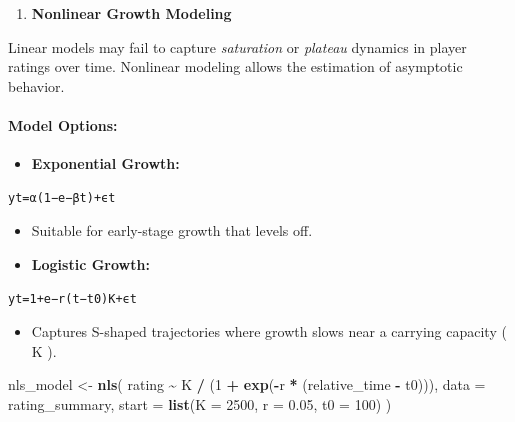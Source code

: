 \documentclass[
]{article}
\newenvironment{Shaded}{\begin{snugshade}}{\end{snugshade}}
\newcommand{\AttributeTok}[1]{\textcolor[rgb]{0.13,0.29,0.53}{#1}}
\newcommand{\DecValTok}[1]{\textcolor[rgb]{0.00,0.00,0.81}{#1}}
\newcommand{\FloatTok}[1]{\textcolor[rgb]{0.00,0.00,0.81}{#1}}
\newcommand{\FunctionTok}[1]{\textcolor[rgb]{0.13,0.29,0.53}{\textbf{#1}}}
\newcommand{\NormalTok}[1]{#1}
\newcommand{\OtherTok}[1]{\textcolor[rgb]{0.56,0.35,0.01}{#1}}
\newcommand{\SpecialCharTok}[1]{\textcolor[rgb]{0.81,0.36,0.00}{\textbf{#1}}}
\providecommand{\tightlist}{%
  \setlength{\itemsep}{0pt}\setlength{\parskip}{0pt}}
\begin{document}
\begin{enumerate}
\def\labelenumi{\arabic{enumi}.}
\setcounter{enumi}{1}
\tightlist
\item
  \textbf{Nonlinear Growth Modeling}
\end{enumerate}

Linear models may fail to capture \emph{saturation} or \emph{plateau}
dynamics in player ratings over time. Nonlinear modeling allows the
estimation of asymptotic behavior.

\paragraph{Model Options:}\label{model-options}

\begin{itemize}
\tightlist
\item
  \textbf{Exponential Growth:}
\end{itemize}

\begin{verbatim}
yt​=α(1−e−βt)+ϵt
\end{verbatim}

\begin{itemize}
\item
  Suitable for early-stage growth that levels off.
\item
  \textbf{Logistic Growth:}
\end{itemize}

\begin{verbatim}
yt​=1+e−r(t−t0​)K​+ϵt​
\end{verbatim}

\begin{itemize}
\tightlist
\item
  Captures S-shaped trajectories where growth slows near a carrying
  capacity ( K ).
\end{itemize}

\begin{Shaded}
\begin{Highlighting}[]
\NormalTok{nls\_model }\OtherTok{\textless{}{-}} \FunctionTok{nls}\NormalTok{(}
\NormalTok{  rating }\SpecialCharTok{\textasciitilde{}}\NormalTok{ K }\SpecialCharTok{/}\NormalTok{ (}\DecValTok{1} \SpecialCharTok{+} \FunctionTok{exp}\NormalTok{(}\SpecialCharTok{{-}}\NormalTok{r }\SpecialCharTok{*}\NormalTok{ (relative\_time }\SpecialCharTok{{-}}\NormalTok{ t0))),}
  \AttributeTok{data =}\NormalTok{ rating\_summary,}
  \AttributeTok{start =} \FunctionTok{list}\NormalTok{(}\AttributeTok{K =} \DecValTok{2500}\NormalTok{, }\AttributeTok{r =} \FloatTok{0.05}\NormalTok{, }\AttributeTok{t0 =} \DecValTok{100}\NormalTok{)}
\NormalTok{)}
\end{Highlighting}
\end{Shaded}
\end{document}
